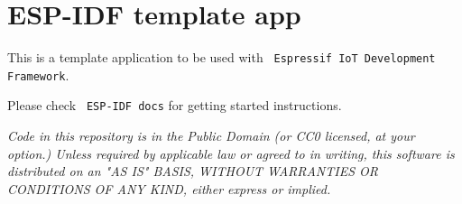 \chapter{ESP-\/\+IDF template app}
\label{md__r_e_a_d_m_e}
This is a template application to be used with {\texttt{ Espressif IoT Development Framework}}.

Please check {\texttt{ ESP-\/\+IDF docs}} for getting started instructions.

{\itshape Code in this repository is in the Public Domain (or CC0 licensed, at your option.) Unless required by applicable law or agreed to in writing, this software is distributed on an "{}\+AS IS"{} BASIS, WITHOUT WARRANTIES OR CONDITIONS OF ANY KIND, either express or implied.} 